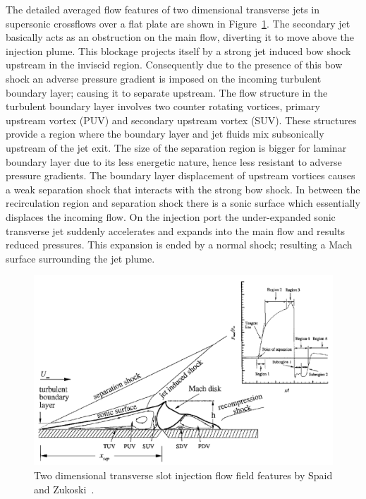 \documentclass[12pt]{article}
\begin{document}
The detailed averaged flow features of two dimensional transverse jets in supersonic crossflows over a flat plate are shown in Figure~\ref{fig:1.6}. The secondary jet basically acts as an obstruction on the main flow, diverting it to move above the injection plume. This blockage projects itself by a strong jet induced bow shock upstream in the inviscid region. Consequently due to the presence of this bow shock an adverse pressure gradient is imposed on the incoming turbulent boundary layer; causing it to separate upstream. The flow structure in the turbulent boundary
layer involves two counter rotating vortices, primary upstream vortex (PUV) and secondary upstream vortex (SUV). These structures provide a region where the boundary layer and jet fluids mix subsonically upstream of the jet exit. The size of the separation region is bigger for laminar boundary layer due to its less energetic nature, hence less resistant to adverse pressure gradients. The boundary layer displacement of upstream vortices causes a weak separation shock that interacts with the strong bow shock. In between the recirculation region and separation shock there is a sonic surface which essentially displaces the incoming flow. On the injection port the under-expanded sonic transverse jet suddenly accelerates and expands into the main flow and results reduced pressures. This expansion is ended by a normal shock; resulting a Mach surface surrounding the jet plume. 

\begin{figure}[H]
    \centering
    \includegraphics[width=\linewidth]{figs/fg1.6.png}
    \caption{Two dimensional transverse slot injection flow field features by Spaid and Zukoski~\cite{spaid1968study}.}
    \label{fig:1.6}
\end{figure}
\end{document}
